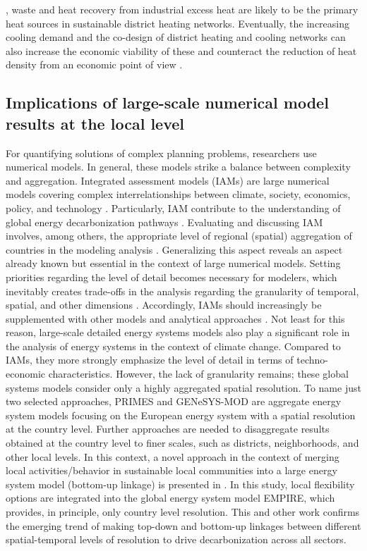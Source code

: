 \cite{di2014low}, waste \cite{hiltunen2020highly} and heat recovery from industrial excess heat \cite{buhler2017industrial} are likely to be the primary heat sources in sustainable district heating networks. Eventually, the increasing cooling demand and the co-design of district heating and cooling networks can also increase the economic viability of these and counteract the reduction of heat density from an economic point of view \cite{zhang2021economic}.

\subsection{Implications of large-scale numerical model results at the local level}
For quantifying solutions of complex planning problems, researchers use numerical models. In general, these models strike a balance between complexity and aggregation. Integrated assessment models (IAMs) are large numerical models covering complex interrelationships between climate, society, economics, policy, and technology \cite{dowlatabadi1995integrated}. Particularly, IAM contribute to the understanding of global energy decarbonization pathways \cite{wilkerson2015comparison}. Evaluating and discussing IAM involves, among others, the appropriate level of regional (spatial) aggregation of countries in the modeling analysis \cite{schwanitz2013evaluating}. Generalizing this aspect reveals an aspect already known but essential in the context of large numerical models. Setting priorities regarding the level of detail becomes necessary for modelers, which inevitably creates trade-offs in the analysis regarding the granularity of temporal, spatial, and other dimensions \cite{gargiulo2013long}. Accordingly, IAMs should increasingly be supplemented with other models and analytical approaches \cite{gambhir2019review}. Not least for this reason, large-scale detailed energy systems models also play a significant role in the analysis of energy systems in the context of climate change. Compared to IAMs, they more strongly emphasize the level of detail in terms of techno-economic characteristics. However, the lack of granularity remains; these global systems models consider only a highly aggregated spatial resolution. To name just two selected approaches, PRIMES \cite{capros2012model} and GENeSYS-MOD \cite{loffler2017designing} are aggregate energy system models focusing on the European energy system with a spatial resolution at the country level. Further approaches are needed to disaggregate results obtained at the country level to finer scales, such as districts, neighborhoods, and other local levels. In this context, a novel approach in the context of merging local activities/behavior in sustainable local communities into a large energy system model (bottom-up linkage) is presented in \cite{backe2021heat}. In this study, local flexibility options are integrated into the global energy system model EMPIRE, which provides, in principle, only country level resolution. This and other work confirms the emerging trend of making top-down and bottom-up linkages between different spatial-temporal levels of resolution to drive decarbonization across all sectors.\vspace{0.3cm}

